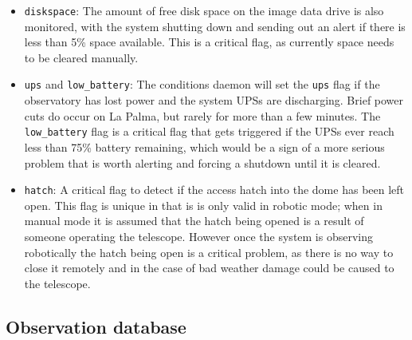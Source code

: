 \begin{colsection}
\begin{colsection}
\begin{itemize}
\item \texttt{diskspace}: The amount of free disk space on the image data drive is also monitored, with the system shutting down and sending out an alert if there is less than 5\% space available. This is a critical flag, as currently space needs to be cleared manually.

\item \texttt{ups} and \texttt{low\_battery}: The conditions daemon will set the \texttt{ups} flag if the observatory has lost power and the system UPSs are discharging. Brief power cuts do occur on La Palma, but rarely for more than a few minutes. The \texttt{low\_battery} flag is a critical flag that gets triggered if the UPSs ever reach less than 75\% battery remaining, which would be a sign of a more serious problem that is worth alerting and forcing a shutdown until it is cleared.

\item \texttt{hatch}: A critical flag to detect if the access hatch into the dome has been left open. This flag is unique in that is is only valid in robotic mode; when in manual mode it is assumed that the hatch being opened is a result of someone operating the telescope. However once the system is observing robotically the hatch being open is a critical problem, as there is no way to close it remotely and in the case of bad weather damage could be caused to the telescope.

\end{itemize}

\end{colsection}


\subsection{Observation database}
\label{sec:obsdb}
\begin{colsection}


\end{colsection}
\end{colsection}
